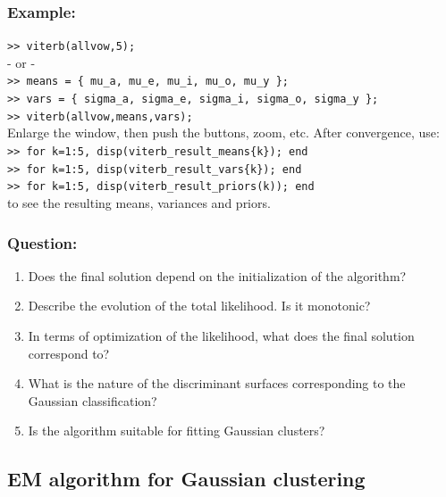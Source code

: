 \documentclass[a4paper]{article}
\newcommand{\mat}[1]{{\tt >> #1} \\}
\begin{document}
\subsubsection*{Example:}
\mat{viterb(allvow,5);}
- or - \\
\mat{means =  \{ mu\_a, mu\_e, mu\_i, mu\_o, mu\_y \};}
\mat{vars = \{ sigma\_a, sigma\_e, sigma\_i, sigma\_o, sigma\_y \};}
\mat{viterb(allvow,means,vars);}
Enlarge the window, then push the buttons, zoom, etc.
After convergence, use:\\
\mat{for k=1:5, disp(viterb\_result\_means\{k\}); end}
\mat{for k=1:5, disp(viterb\_result\_vars\{k\}); end}
\mat{for k=1:5, disp(viterb\_result\_priors(k)); end}
to see the resulting means, variances and priors.


\subsubsection*{Question:}
\begin{enumerate}
\item Does the final solution depend on the initialization of the
algorithm?
\item Describe the evolution of the total likelihood. Is it monotonic?
\item In terms of optimization of the likelihood, what does the final
solution correspond to?
\item What is the nature of the discriminant surfaces corresponding to the
Gaussian classification?
\item Is the algorithm suitable for fitting Gaussian clusters?
\end{enumerate}




\subsection{EM algorithm for Gaussian clustering}
\end{document}
